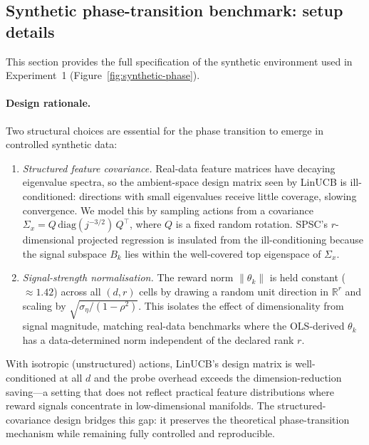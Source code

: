 \documentclass{article}
\newcommand{\R}{\mathbb{R}}
\begin{document}
{\subsection{Synthetic phase-transition benchmark: setup details}
\label{app:synthetic_setup}

This section provides the full specification of the synthetic
environment used in Experiment~1
(Figure~\ref{fig:synthetic-phase}).


 \paragraph{Design rationale.}
  Two structural choices are essential for the phase transition to
  emerge in controlled synthetic data:
  \begin{enumerate}[nosep,leftmargin=1.5em]
    \item \emph{Structured feature covariance.}
    Real-data feature matrices have decaying eigenvalue spectra, so
    the ambient-space design matrix seen by LinUCB is ill-conditioned:
    directions with small eigenvalues receive little coverage, slowing
    convergence.
    We model this by sampling actions from a covariance
    $\Sigma_x = Q\,\mathrm{diag}(j^{-3/2})\,Q^\top$, where $Q$ is a
    fixed random rotation.
    SPSC's $r$-dimensional projected regression is insulated from the
    ill-conditioning because the signal subspace $B_k$ lies within the
    well-covered top eigenspace of $\Sigma_x$.

    \item \emph{Signal-strength normalisation.}
    The reward norm $\|\theta_k\|$ is held constant ($\approx 1.42$)
    across all $(d,r)$ cells by drawing a random unit direction in
    $\R^r$ and scaling by $\sqrt{\sigma_\eta/(1-\rho^2)}$.
    This isolates the effect of dimensionality from signal magnitude,
    matching real-data benchmarks where the OLS-derived $\theta_k$ has
    a data-determined norm independent of the declared rank $r$.
  \end{enumerate}
  With isotropic (unstructured) actions, LinUCB's design matrix is
  well-conditioned at all $d$ and the probe overhead exceeds the
  dimension-reduction saving---a setting that does not reflect practical feature
  distributions where reward signals concentrate in low-dimensional manifolds.
  The structured-covariance design bridges this gap: it preserves the
  theoretical phase-transition mechanism while remaining fully
  controlled and reproducible.

}
\end{document}
